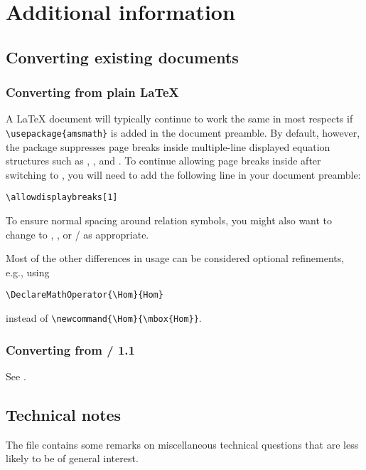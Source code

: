 \documentclass[leqno,titlepage,openany]{amsldoc}[1999/12/13]
\begin{document}

\chapter{Additional information}

\section{Converting existing documents}

\subsection{Converting from plain \LaTeX{}}

A \LaTeX{} document will typically continue to work the same in most
respects if \verb'\usepackage{amsmath}' is added in the document
preamble. By default, however, the  package suppresses page
breaks inside multiple-line displayed equation structures such as
, , and . To continue allowing page
breaks inside  after switching to , you will
need to add the following line in your document preamble:
\begin{verbatim}
\allowdisplaybreaks[1]
\end{verbatim}
To ensure normal spacing around relation symbols, you might also want to
change  to , , or
\slash{} as appropriate.

Most of the other differences in  usage can be considered
optional refinements, e.g., using
\begin{verbatim}
\DeclareMathOperator{\Hom}{Hom}
\end{verbatim}
instead of \verb'\newcommand{\Hom}{\mbox{Hom}}'.

\subsection{Converting from \amslatex/ 1.1}
See .

\section{Technical notes}
The file  contains some remarks on miscellaneous
technical questions that are less likely to be of general interest.
\end{document}
